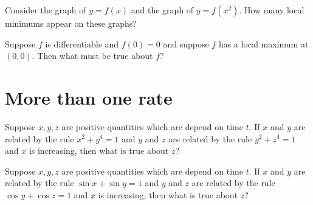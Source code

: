 \documentclass{ximera}
\begin{document}
\begin{problem}
  Consider the graph of $y = f(x)$ and the graph of $y = f(x^2)$.  How many local minimums appear on these graphs?
  \begin{multipleChoice}
  \end{multipleChoice}
\end{problem}

\begin{problem}
  Suppose $f$ is differentiable and $f(0) = 0$ and suppose $f$ has a
  local maximum at $(0,0)$.  Then what must be true about $f$?
  \begin{multipleChoice}
  \end{multipleChoice}
\end{problem}

\clearpage

\section{More than one rate}

\begin{problem}
  Suppose $x, y, z$ are positive quantities which are depend on time
  $t$.  If $x$ and $y$ are related by the rule $x^2 + y^4 = 1$ and $y$
  and $z$ are related by the rule $y^2 + z^4 = 1$ and $x$ is
  increasing, then what is true about $z$?
  \begin{multipleChoice}
  \end{multipleChoice}
\end{problem}

\begin{problem}
  Suppose $x, y, z$ are positive quantities which are depend on time
  $t$.  If $x$ and $y$ are related by the rule $\sin x + \sin y = 1$ and $y$
  and $z$ are related by the rule $\cos y + \cos z = 1$ and $x$ is
  increasing, then what is true about $z$?
  \begin{multipleChoice}
  \end{multipleChoice}
\end{problem}
\end{document}
